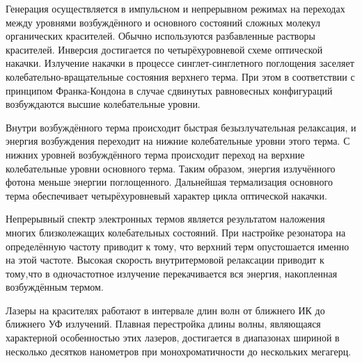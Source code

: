 Генерация осуществляется в импульсном и непрерывном режимах на переходах между 
уровнями возбуждённого и основного состояний сложных молекул органических 
красителей. Обычно используются разбавленные растворы красителей. Инверсия 
достигается по четырёхуровневой схеме оптической накачки. Излучение накачки в 
процессе синглет-синглетного поглощения заселяет колебательно-вращательные 
состояния верхнего терма. При этом в соответствии с принципом Франка-Кондона в 
случае сдвинутых равновесных конфигураций возбуждаются высшие колебательные уровни.

Внутри возбуждённого терма происходит быстрая безызлучательная релаксация, и 
энергия возбуждения переходит на нижние колебательные уровни этого терма. С 
нижних уровней возбуждённого терма происходит переход на верхние колебательные 
уровни основного терма. Таким образом, энергия излучённого фотона меньше 
энергии поглощенного. Дальнейшая термализация основного терма обеспечивает 
четырёхуровневый характер цикла оптической накачки.

Непрерывный спектр электронных термов является результатом наложения многих 
близколежащих колебательных состояний. При настройке резонатора на 
определённую частоту приводит к тому, что верхний терм опустошается именно на 
этой частоте. Высокая скорость внутритермовой релаксации приводит к тому,что в 
одночастотное излучение перекачивается вся энергия, накопленная возбуждённым 
термом.

Лазеры на красителях работают в интервале длин волн от ближнего ИК до ближнего 
УФ излучений. Плавная перестройка длины волны, являющаяся характерной 
особенностью этих лазеров, достигается в диапазонах шириной в несколько 
десятков нанометров при монохроматичности до нескольких мегагерц.